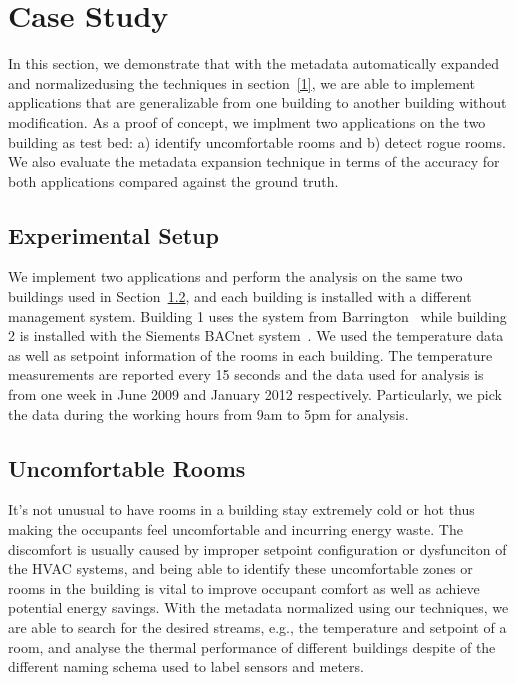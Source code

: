 \section{Case Study}
In this section, we demonstrate that with the metadata automatically expanded and normalizedusing the techniques in section~\ref{1}, we are able to implement applications that are generalizable from one building to another building without modification. As a proof of concept, we implment two applications on the two building as test bed: a) identify uncomfortable rooms and b) detect rogue rooms. We also evaluate the metadata expansion technique in terms of the accuracy for both applications compared against the ground truth. 

\subsection{Experimental Setup}
We implement two applications and perform the analysis on the same two buildings used in Section~\ref{}, and each building is installed with a different management system. Building 1 uses the system from Barrington~\cite{1} while building 2 is installed with the Siements BACnet system~\cite{1}. We used the temperature data as well as setpoint information of the rooms in each building. The temperature measurements are reported every 15 seconds and the data used for analysis is from one week in June 2009 and January 2012 respectively. Particularly, we pick the data during the working hours from 9am to 5pm for analysis.

\subsection{Uncomfortable Rooms}
It's not unusual to have rooms in a building stay extremely cold or hot thus making the occupants feel uncomfortable and incurring energy waste. The discomfort is usually caused by improper setpoint configuration or dysfunciton of the HVAC systems, and being able to identify these uncomfortable zones or rooms in the building is vital to improve occupant comfort as well as achieve potential energy savings. With the metadata normalized using our techniques, we are able to search for the desired streams, e.g., the temperature and setpoint of a room, and analyse the thermal performance of different buildings despite of the different naming schema used to label sensors and meters.

